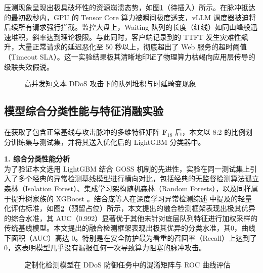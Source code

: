 \documentclass[master, vlined]{DissertUESTC}
\begin{document}
	压测现象呈现出极具破坏性的资源崩溃态势，如图\ref{fig: 高并发DDoS排队畸变图}（待插入）所示。在脉冲抵达的最初数秒内，GPU 的 Tensor Core 算力被瞬间极度透支，vLLM 调度器被迫将后续所有请求强行拦截。监控大盘上，Waiting 队列的长度（红线）如同山峰般迅速堆积，斜率达到理论极限。与此同时，客户端记录到的 TTFT 发生灾难性飙升，大量正常请求的延迟恶化至 50 秒以上，彻底超出了 Web 服务的超时阈值（Timeout SLA）。这一实验结果极其清晰地印证了物理算力枯竭向应用层传导的级联失效假说。

	\begin{figure}[!htb]
		\centering
		\caption{高并发短文本 DDoS 攻击下的队列堆积与时延畸变现象} \label{fig: 高并发DDoS排队畸变图}
	\end{figure}

	\subsection{模型综合分类性能与特征消融实验}
	在获取了包含正常基线与攻击脉冲的多维特征矩阵 $\mathbf{F}_{18}$ 后，本文以 8:2 的比例划分训练集与测试集，并将其送入优化后的 LightGBM 分类器中。


	\textbf{1. 综合分类性能分析} \\
	为了验证本文选用 LightGBM 结合 GOSS 机制的先进性，实验在同一测试集上引入了多个经典的异常检测基线模型进行横向对比，包括经典的无监督检测算法孤立森林（Isolation Forest）\cite{孤立森林算法}、集成学习架构随机森林（Random Forests）\cite{随机森林算法原理论文}，以及同样属于提升树家族的 XGBoost \cite{XGBoost可扩展的树提升系统}。结合庞等人在深度学习异常检测综述 \cite{深度学习异常检测综述} 中提及的轻量化评估标准，如图\ref{fig: 检测模型混淆矩阵与ROC曲线图}（预留占位）所示，本文提出的融合检测框架表现出极其优异的综合水准，其 AUC（0.992）显著优于其他未针对底层队列特征进行加权采样的传统基线模型。本文提出的融合检测框架表现出极其优异的分类水准，其0，曲线下面积（AUC）高达 0。特别是在安全防护最为看重的召回率（Recall）上达到了 0，这表明模型几乎没有漏报任何一次导致算力阻塞的脉冲攻击。

	\begin{figure}[!htb]
		\centering
		\caption{定制化检测模型在 DDoS 防御任务中的混淆矩阵与 ROC 曲线评估} \label{fig: 检测模型混淆矩阵与ROC曲线图}
	\end{figure}
\end{document}
